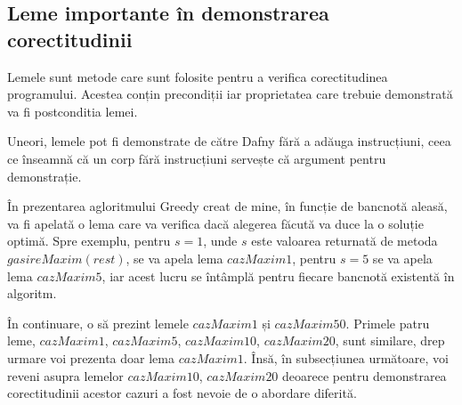 \subsection{Leme importante în demonstrarea corectitudinii}
Lemele sunt metode care sunt folosite pentru a verifica corectitudinea programului. Acestea conțin precondiții iar proprietatea care trebuie demonstrată va fi postconditia lemei.\par
Uneori, lemele pot fi demonstrate de către Dafny fără a adăuga instrucțiuni, ceea ce înseamnă că un corp fără instrucțiuni servește că argument pentru demonstrație.
\par
În prezentarea agloritmului Greedy creat de mine, în funcție de bancnotă aleasă, va fi apelată o lema care va verifica dacă alegerea făcută va duce la o soluție optimă. Spre exemplu, pentru $s = 1$, unde $s$ este valoarea returnată de metoda $gasireMaxim(rest)$, se va apela lema $cazMaxim1$, pentru $s = 5$ se va apela lema $cazMaxim5$, iar acest lucru se întâmplă pentru fiecare bancnotă existentă în algoritm. \par 
În continuare, o să prezint lemele $cazMaxim1$ și $cazMaxim50$. Primele patru leme, $cazMaxim1$, $cazMaxim5$, $cazMaxim10$, $cazMaxim20$, sunt similare, drep urmare voi prezenta doar lema $cazMaxim1$. Însă, în subsecțiunea următoare, voi reveni asupra lemelor $cazMaxim10$, $cazMaxim20$ deoarece pentru demonstrarea corectitudinii acestor cazuri a fost nevoie de o abordare diferită.
\vspace{2.5cm}
